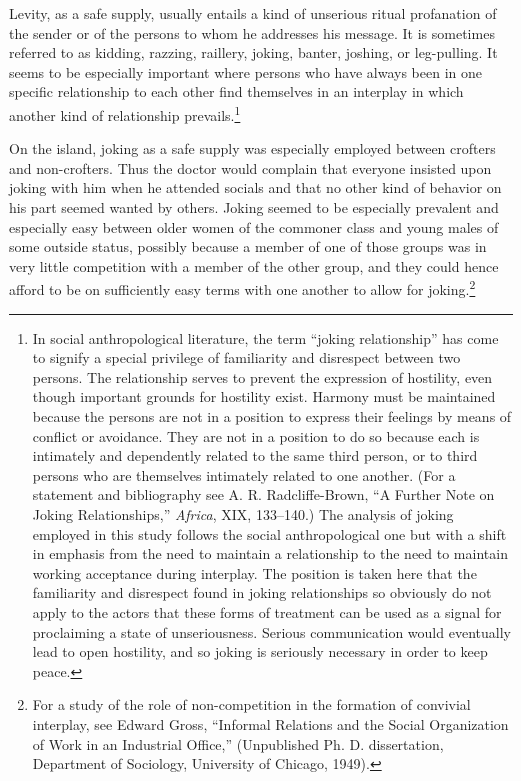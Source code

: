 \documentclass[openany,nobib]{tufte-book}
\begin{document}
Levity, as a safe supply, usually entails a kind of unserious ritual
profanation of the sender or of the persons to whom he addresses his
message. It is sometimes referred to as kidding, razzing, raillery,
joking, banter, joshing, or leg-pulling. It seems to be especially
important where persons who have always been in one specific
relationship to each other find themselves in an interplay in which
another kind of relationship prevails.\footnote{In social
  anthropological literature, the term ``joking relationship'' has come
  to signify a special privilege of familiarity and disrespect between
  two persons. The relationship serves to prevent the expression of
  hostility, even though important grounds for hostility exist. Harmony
  must be maintained because the persons are not in a position to
  express their feelings by means of conflict or avoidance. They are not
  in a position to do so because each is intimately and dependently
  related to the same third person, or to third persons who are
  themselves intimately related to one another. (For a statement and
  bibliography see A. R. Radcliffe-Brown, ``A Further Note on Joking
  Relationships,'' \emph{Africa}, XIX, 133--140.) The analysis of joking
  employed in this study follows the social anthropological one but with
  a shift in emphasis from the need to maintain a relationship to the
  need to maintain working acceptance during interplay. The position is
  taken here that the familiarity and disrespect found in joking
  relationships so obviously do not apply to the actors that these forms
  of treatment can be used as a signal for proclaiming a state of
  unseriousness. Serious communication would eventually lead to open
  hostility, and so joking is seriously necessary in order to keep
  peace.}

On the island, joking as a safe supply was especially employed between
crofters and non-crofters. Thus the doctor would complain that everyone
insisted upon joking with him when he attended socials and that no other
kind of behavior on his part seemed wanted by others. Joking seemed to
be especially prevalent and especially easy between older women of the
commoner class and young males of some outside status, possibly because
a member of one of those groups was in very little competition with a
member of the other group, and they could hence afford to be on
sufficiently easy terms with one another to allow for joking.\footnote{For
  a study of the role of non-competition in the formation of convivial
  interplay, see Edward Gross, ``Informal Relations and the Social
  Organization of Work in an Industrial Office,'' (Unpublished Ph. D.
  dissertation, Department of Sociology, University of Chicago, 1949).}
\end{document}
